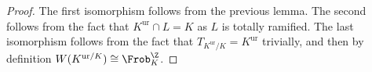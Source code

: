 \documentclass[a4paper]{article}
\begin{document}
\begin{proof}
  The first isomorphism follows from the previous lemma. The second follows from the fact that $K^{\mathrm{ur}} \cap L = K$ as $L$ is totally ramified. The last isomorphism follows from the fact that $T_{K^{\mathrm{ur}}/K} = K^{\mathrm{ur}}$ trivially, and then by definition $W(K^{\mathrm{ur}/K}) \cong \Frob_K^\Z$.
\end{proof}

%
%
%
%
%
\end{document}
